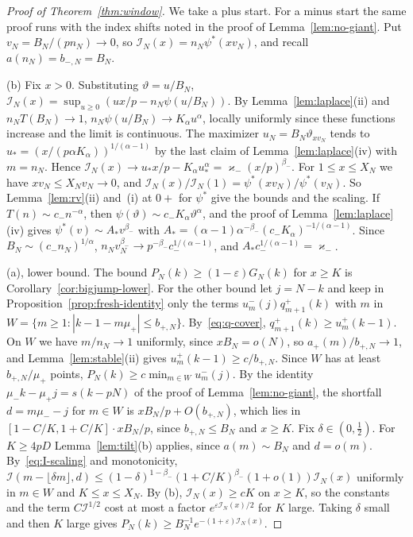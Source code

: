 \begin{proof}[Proof of Theorem~\ref{thm:window}]
We take a plus start. For a minus start the same proof runs with the index shifts noted in
the proof of Lemma~\ref{lem:no-giant}. Put $v_N=B_N/(pn_N)\to0$, so
$\mathcal I_N(x)=n_N\psi^*(xv_N)$, and recall $a(n_N)=b_{\minus,N}=B_N$.

(b) Fix $x>0$. Substituting $\vartheta=u/B_N$,
$\mathcal I_N(x)=\sup_{u\ge0}(ux/p-n_N\psi(u/B_N))$. By Lemma~\ref{lem:laplace}(ii) and
$n_NT(B_N)\to1$, $n_N\psi(u/B_N)\to K_\alpha u^\alpha$, locally uniformly since these
functions increase and the limit is continuous. The maximizer $u_N=B_N\vartheta_{xv_N}$
tends to $u_*=(x/(p\alpha K_\alpha))^{1/(\alpha-1)}$ by the last claim of
Lemma~\ref{lem:laplace}(iv) with $m=n_N$. Hence
$\mathcal I_N(x)\to u_*x/p-K_\alpha u_*^\alpha=\varkappa_\minus(x/p)^{\beta_\minus}$. For
$1\le x\le X_N$ we have $xv_N\le X_Nv_N\to0$, and
$\mathcal I_N(x)/\mathcal I_N(1)=\psi^*(xv_N)/\psi^*(v_N)$. So Lemma~\ref{lem:rv}(ii) and~(i) at
$0+$ for $\psi^*$ give the bounds and the scaling. If $T(n)\sim c_\minus n^{-\alpha}$, then
$\psi(\vartheta)\sim c_\minus K_\alpha\vartheta^\alpha$, and the proof of
Lemma~\ref{lem:laplace}(iv) gives $\psi^*(v)\sim A_*v^{\beta_\minus}$ with
$A_*=(\alpha-1)\alpha^{-\beta_\minus}(c_\minus K_\alpha)^{-1/(\alpha-1)}$. Since
$B_N\sim(c_\minus n_N)^{1/\alpha}$, $n_Nv_N^{\beta_\minus}\to p^{-\beta_\minus}c_\minus^{1/(\alpha-1)}$,
and $A_*c_\minus^{1/(\alpha-1)}=\varkappa_\minus$.

(a), lower bound. The bound $P_N(k)\ge(1-\varepsilon)G_N(k)$ for $x\ge K$ is
Corollary~\ref{cor:bigjump-lower}. For the other bound let $j=N-k$ and keep in
Proposition~\ref{prop:fresh-identity} only the terms $u^\minus_m(j)q^\plus_{m+1}(k)$ with $m$
in $W=\{m\ge1:|k-1-m\mu_\plus|\le b_{\plus,N}\}$. By~\eqref{eq:q-cover},
$q^\plus_{m+1}(k)\ge u^\plus_m(k-1)$. On $W$ we have $m/n_N\to1$ uniformly, since
$xB_N=o(N)$, so $a_\plus(m)/b_{\plus,N}\to1$, and Lemma~\ref{lem:stable}(ii) gives
$u^\plus_m(k-1)\ge c/b_{\plus,N}$. Since $W$ has at least $b_{\plus,N}/\mu_\plus$ points,
$P_N(k)\ge c\min_{m\in W}u^\minus_m(j)$. By the identity $\mu_\minus k-\mu_\plus j=s(k-pN)$ of
the proof of Lemma~\ref{lem:no-giant}, the shortfall $d=m\mu_\minus-j$ for $m\in W$ is
$xB_N/p+O(b_{\plus,N})$, which lies in $[1-C/K,1+C/K]\cdot xB_N/p$, since
$b_{\plus,N}\le B_N$ and $x\ge K$. Fix $\delta\in(0,\frac12)$. For $K\ge4pD$
Lemma~\ref{lem:tilt}(b) applies, since $a(m)\sim B_N$ and $d=o(m)$. By~\eqref{eq:I-scaling} and
monotonicity,
$\mathcal I(m-\lfloor\delta m\rfloor,d)\le(1-\delta)^{1-\beta_\minus}(1+C/K)^{\beta_\minus}(1+o(1))\mathcal I_N(x)$
uniformly in $m\in W$ and $K\le x\le X_N$. By (b), $\mathcal I_N(x)\ge cK$ on $x\ge K$, so the
constants and the term $C\mathcal I^{1/2}$ cost at most a factor $e^{\varepsilon\mathcal I_N(x)/2}$
for $K$ large. Taking $\delta$ small and then $K$ large gives
$P_N(k)\ge B_N^{-1}e^{-(1+\varepsilon)\mathcal I_N(x)}$.


\end{proof}
